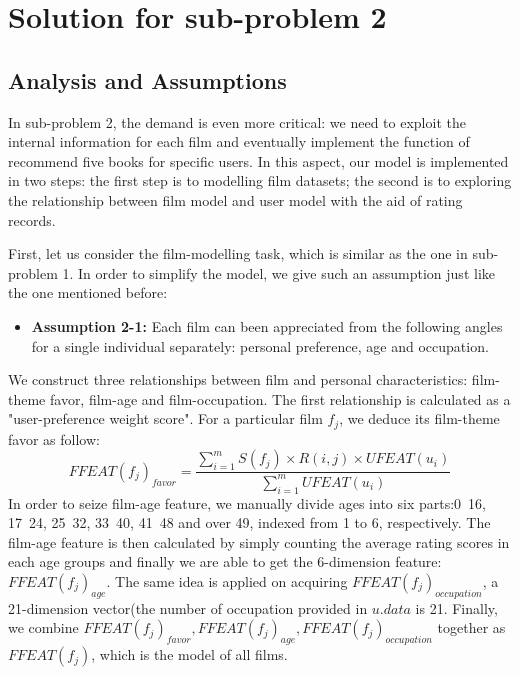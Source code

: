 \section{Solution for sub-problem 2}
\subsection{Analysis and Assumptions}
In sub-problem 2, the demand is even more critical: we need to exploit the internal information for each film and eventually implement the function of recommend five books for specific users. In this aspect, our model is implemented in two steps: the first step is to modelling film datasets; the second is to exploring the relationship between film model and user model with the aid of rating records.

First, let us consider the film-modelling task, which is similar as the one in sub-problem 1. In order to simplify the model, we give such an assumption just like the one mentioned before\cite{jung2012attribute}:

\begin{itemize}
\item \textbf{Assumption 2-1:} Each film can been appreciated from the following angles for a single individual separately: personal preference, age and occupation.
\end{itemize} 


We construct three relationships between film and personal characteristics: film-theme favor, film-age and film-occupation. The first relationship is calculated as a "user-preference weight score".
For a particular film $f_{j}$, we deduce its film-theme favor as follow:
\begin{equation}
FFEAT(f_{j})_{favor}=\dfrac {\sum ^{m}_{i=1}S\left( f_{j}\right) \times R\left( i,j\right) \times UFEAT\left( u_{i}\right) }{\sum ^{m}_{i=1}UFEAT\left( u_{i}\right) }
\end{equation}
In order to seize film-age feature, we manually divide ages into six parts:0~16, 17~24, 25~32, 33~40, 41~48 and over 49, indexed from 1 to 6, respectively. The film-age feature is then calculated by simply counting the average rating scores in each age groups and finally we are able to get the 6-dimension feature: $FFEAT(f_{j})_{age}$. The same idea is applied on acquiring $FFEAT(f_{j})_{occupation}$, a 21-dimension vector(the number of occupation provided in $u.data$ is 21. Finally, we combine $FFEAT(f_{j})_{favor}, FFEAT(f_{j})_{age}, FFEAT(f_{j})_{occupation}$ together as $FFEAT(f_{j})$, which is the model of all films. 

